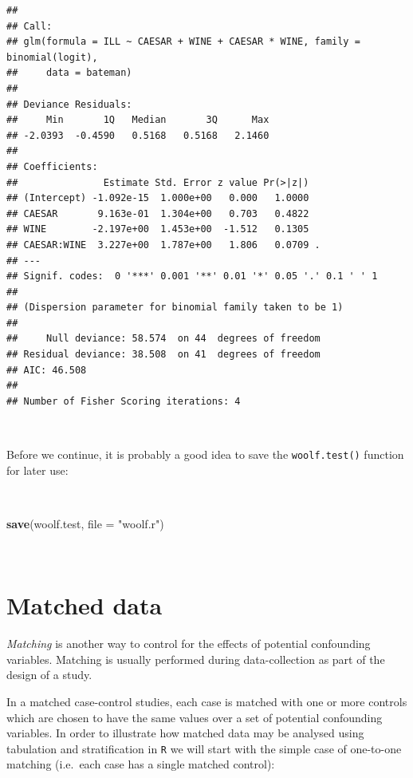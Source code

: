 \documentclass[12pt,a4paper]{book}
\newenvironment{Shaded}{\begin{snugshade}}{\end{snugshade}}
\newcommand{\KeywordTok}[1]{\textcolor[rgb]{0.13,0.29,0.53}{\textbf{#1}}}
\newcommand{\DataTypeTok}[1]{\textcolor[rgb]{0.13,0.29,0.53}{#1}}
\newcommand{\StringTok}[1]{\textcolor[rgb]{0.31,0.60,0.02}{#1}}
\newcommand{\NormalTok}[1]{#1}
\theoremstyle{definition}
\theoremstyle{definition}
\theoremstyle{definition}
\theoremstyle{remark}
\begin{document}
\begin{verbatim}
## 
## Call:
## glm(formula = ILL ~ CAESAR + WINE + CAESAR * WINE, family = binomial(logit), 
##     data = bateman)
## 
## Deviance Residuals: 
##     Min       1Q   Median       3Q      Max  
## -2.0393  -0.4590   0.5168   0.5168   2.1460  
## 
## Coefficients:
##               Estimate Std. Error z value Pr(>|z|)  
## (Intercept) -1.092e-15  1.000e+00   0.000   1.0000  
## CAESAR       9.163e-01  1.304e+00   0.703   0.4822  
## WINE        -2.197e+00  1.453e+00  -1.512   0.1305  
## CAESAR:WINE  3.227e+00  1.787e+00   1.806   0.0709 .
## ---
## Signif. codes:  0 '***' 0.001 '**' 0.01 '*' 0.05 '.' 0.1 ' ' 1
## 
## (Dispersion parameter for binomial family taken to be 1)
## 
##     Null deviance: 58.574  on 44  degrees of freedom
## Residual deviance: 38.508  on 41  degrees of freedom
## AIC: 46.508
## 
## Number of Fisher Scoring iterations: 4
\end{verbatim}

~

Before we continue, it is probably a good idea to save the
\texttt{woolf.test()} function for later use:

~

\begin{Shaded}
\begin{Highlighting}[]
\KeywordTok{save}\NormalTok{(woolf.test, }\DataTypeTok{file =} \StringTok{"woolf.r"}\NormalTok{)}
\end{Highlighting}
\end{Shaded}

~

\hypertarget{matched-data}{%
\section{Matched data}\label{matched-data}}

\emph{Matching} is another way to control for the effects of potential
confounding variables. Matching is usually performed during
data-collection as part of the design of a study.

In a matched case-control studies, each case is matched with one or more
controls which are chosen to have the same values over a set of
potential confounding variables. In order to illustrate how matched data
may be analysed using tabulation and stratification in \texttt{R} we
will start with the simple case of one-to-one matching (i.e.~each case
has a single matched control):

~
\end{document}
